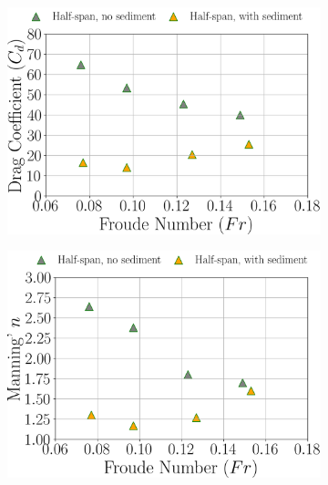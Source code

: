 \documentclass[preview, border=2pt]{standalone}
\begin{document}
\begin{figure}
\begin{subfigure}[b]{0.48\textwidth}
         \includegraphics[width=\textwidth]{Cd_Fr_dependence_half_span_cases.png}
     \end{subfigure}
     \hfill     
     \begin{subfigure}[b]{0.48\textwidth}
         \centering
         \caption{}
         \includegraphics[width=\textwidth]{ManningN_Fr_dependence_half_span_cases.png}
     \end{subfigure}
\end{figure}
\end{document}
